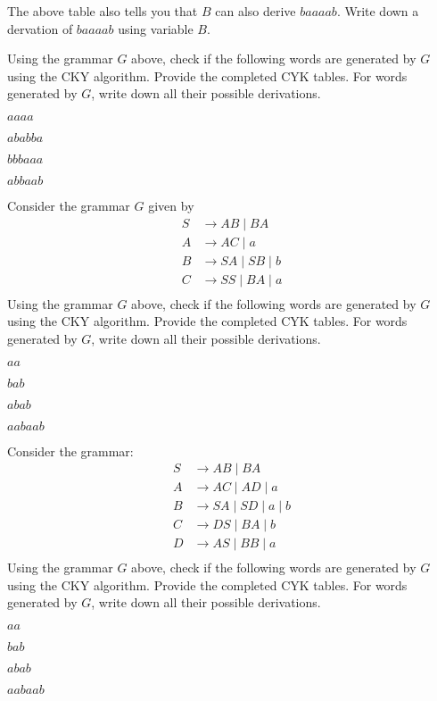\newpage
\begin{ex}
The above table also tells you that $B$ can also derive $baaaab$.
Write down a dervation of $baaaab$ using variable $B$.
\end{ex}

\newpage
\begin{ex}
  Using the grammar $G$ above, check if the following words are generated
  by $G$ using the CKY algorithm. Provide the completed CYK tables.
  For words generated by $G$, write down all their
  possible derivations. 
  \begin{tightlist}
  \item $aaaa$
  \item $ababba$
  \item $bbbaaa$
  \item $abbaab$
  \end{tightlist}
\end{ex}

\newpage
\begin{ex}
  Consider the grammar $G$ given by
  \begin{align*}
    S &\rightarrow AB \mid BA \\
    A &\rightarrow AC \mid a \\
    B &\rightarrow SA \mid SB \mid b \\
    C &\rightarrow SS \mid BA \mid a \\
  \end{align*}
  Using the grammar $G$ above, check if the following words are generated
  by $G$ using the CKY algorithm. Provide the completed CYK tables.
  For words generated by $G$, write down all their
  possible derivations. 
  \begin{tightlist}
  \item $aa$
  \item $bab$
  \item $abab$
  \item $aabaab$
  \end{tightlist}
\end{ex}


\newpage
\begin{ex}
  Consider the grammar:
  \begin{align*}
    S &\rightarrow AB \mid BA \\
    A &\rightarrow AC \mid AD \mid a \\
    B &\rightarrow SA \mid SD \mid a \mid b \\
    C &\rightarrow DS \mid BA \mid b \\
    D &\rightarrow AS \mid BB \mid a \\
  \end{align*}
  Using the grammar $G$ above, check if the following words are generated
  by $G$ using the CKY algorithm. Provide the completed CYK tables.
  For words generated by $G$, write down all their
  possible derivations. 
  \begin{tightlist}
  \item $aa$
  \item $bab$
  \item $abab$
  \item $aabaab$
  \end{tightlist}
\end{ex}

